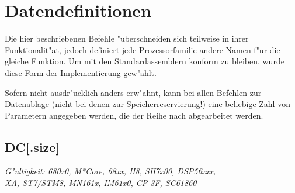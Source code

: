 \documentclass[12pt,a4paper,twoside]{report}
\makeatletter
\newcommand{\ttindex}[1]{\index{#1@{\tt #1}}}
\makeatother
\begin{document}

\section{Datendefinitionen}

Die hier beschriebenen Befehle "uberschneiden sich teilweise in ihrer
Funktionalit"at, jedoch definiert jede Prozessorfamilie andere Namen
f"ur die gleiche Funktion.  Um mit den Standardassemblern konform zu
bleiben, wurde diese Form der Implementierung gew"ahlt.

Sofern nicht ausdr"ucklich anders erw"ahnt, kann bei allen Befehlen zur
Datenablage (nicht bei denen zur Speicherreservierung!) eine beliebige Zahl
von Parametern angegeben werden, die der Reihe nach abgearbeitet werden.


\subsection{DC[.size]}
\ttindex{DC}

{\em G"ultigkeit: 680x0, M*Core, 68xx, H8, SH7x00, DSP56xxx,\\
     XA, ST7/STM8, MN161x, IM61x0, CP-3F, SC61860}
\end{document}
